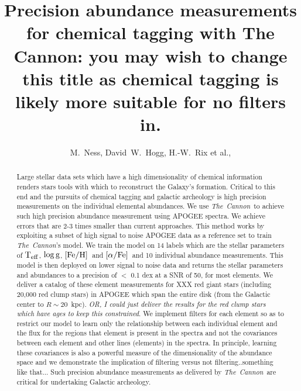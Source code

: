 \documentclass[12pt, preprint]{aastex}
\newcommand{\project}[1]{\textsl{#1}}
\newcommand{\tc}{\project{The~Cannon}}
\newcommand{\teff}{\mbox{$\rm T_{eff}$}}
\newcommand{\feh}{\mbox{$\rm [Fe/H]$}}
\newcommand{\alphafe}{\mbox{$\rm [\alpha/Fe]$}}
\newcommand{\logg}{\mbox{$\rm \log g$}}
\begin{document}
\title{Precision abundance measurements for chemical tagging with The Cannon: you may wish to change this title as chemical tagging is likely more suitable for no filters in. }
\author{M.~Ness,
        David~W.~Hogg,
        H.-W.~Rix et al.,}


\begin{abstract}%
Large stellar data sets which have a high dimensionality of chemical information renders stars tools with which to reconstruct the Galaxy's formation. Critical to this end and the pursuits of chemical tagging and galactic archeology is high precision measurements on the individual elemental abundances. We use \tc\ to achieve such high precision abundance measurement using APOGEE spectra. We achieve errors that are 2-3 times smaller than current approaches.  This method works by exploiting a subset of high signal to noise APOGEE data as a reference set to train \tc's model. We train the model on 14 labels which are the stellar parameters of \teff, \logg, \feh\ and \alphafe\ and 10 individual abundance measurements. This model is then deployed on lower signal to noise data and returns the stellar parameters and abundances to a precision of $<$ 0.1 dex at a SNR of 50, for most elements.  We deliver a catalog of these element measurements for XXX red giant stars (including 20,000 red clump stars) in APOGEE which span the entire disk (from the Galactic center to $R\sim 20$~kpc). \textit{OR, I could just deliver the results for the red clump stars which have ages to keep this constrained}. 
We implement filters for each element so as to restrict our model to learn only the relationship between each individual element and the flux for the regions that element is present in the spectra and not the covariances between each element and other lines (elements) in the spectra. In principle, learning these covariances is also a powerful measure of the dimensionality of the abundance space and we demonstrate the implication of filtering versus not filtering..something like that...
Such precision abundance measurements as delivered by \tc\ are critical for undertaking Galactic archeology.


\end{abstract}
\end{document}
